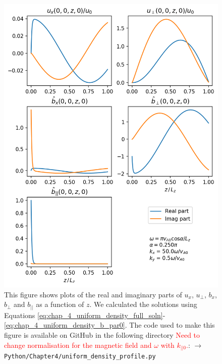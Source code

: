 \begin{figure}
    \centering
    \vspace{-20pt}
    \includegraphics[width=\textwidth,height=0.9\textheight,keepaspectratio]{figures/chapter04/uniform_density_profile.png}
    \vspace{-10pt}
    \caption{This figure shows plots of the real and imaginary parts of $u_x$, $u_\perp$, $b_x$, $b_\perp$ and $b_{||}$ as a function of $z$. We calculated the solutions using Equations \eqref{eq:chap_4_uniform_density_full_soln}-\eqref{eq:chap_4_uniform_density_b_par0}. The code used to make this figure is available on GitHub in the following directory \textcolor{red}{Need to change normalisation for the magnetic field and $\omega$ with $k_{||0}$.}:\newline
    \texttt{$\rightarrow$ Python/Chapter4/uniform\_density\_profile.py}}
    \label{fig:uniform_density_profile}
    \vspace{-20pt}
\end{figure}

